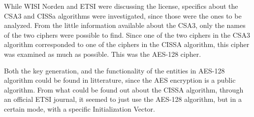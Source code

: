 While WISI Norden and ETSI were discussing the license, specifics about 
the CSA3 and CISSa algorithms were investigated, since those were the 
ones to be analyzed. From the little information available about 
the CSA3, only the names of the two ciphers were possible to find. 
Since one of the two ciphers in the CSA3 algorithm corresponded to one 
of the ciphers in the CISSA algorithm, this cipher was examined as much 
as possible. This was the AES-128 cipher.

Both the key generation, and the functionality of the entities in 
AES-128 algorithm could be found in litterature, since the AES 
encryption is a public algorithm. From what could be found out about 
the CISSA algorithm, through an official ETSI journal, it seemed to 
just use the AES-128 algorithm, but in a certain mode, with a specific 
Initialization Vector.
